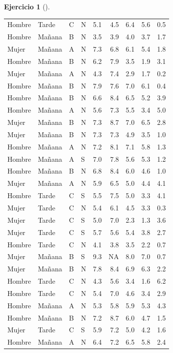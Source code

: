 \documentclass[
  a4paper,
]{scrreport}
\theoremstyle{definition}
\newtheorem{exercise}{Ejercicio}[chapter]
\theoremstyle{remark}
\begin{document}
\begin{exercise}[]
\begin{enumerate}
\begin{tcolorbox}
\begin{longtable}[]{@{}llllrrrrr@{}}
  Hombre & Tarde & C & N & 5.1 & 4.5 & 6.4 & 5.6 & 0.5 \\
  Hombre & Mañana & B & N & 3.5 & 3.9 & 4.0 & 3.7 & 1.7 \\
  Mujer & Mañana & A & N & 7.3 & 6.8 & 6.1 & 5.4 & 1.8 \\
  Hombre & Mañana & B & N & 6.2 & 7.9 & 3.5 & 1.9 & 3.1 \\
  Mujer & Mañana & A & N & 4.3 & 7.4 & 2.9 & 1.7 & 0.2 \\
  Hombre & Mañana & B & N & 7.9 & 7.6 & 7.0 & 6.1 & 0.4 \\
  Hombre & Mañana & B & N & 6.6 & 8.4 & 6.5 & 5.2 & 3.9 \\
  Hombre & Mañana & A & N & 5.6 & 7.3 & 5.5 & 3.4 & 5.0 \\
  Mujer & Mañana & B & N & 7.3 & 8.7 & 7.0 & 6.5 & 2.8 \\
  Mujer & Mañana & B & N & 7.3 & 7.3 & 4.9 & 3.5 & 1.0 \\
  Hombre & Mañana & A & N & 7.2 & 8.1 & 7.1 & 5.8 & 1.3 \\
  Hombre & Mañana & A & S & 7.0 & 7.8 & 5.6 & 5.3 & 1.2 \\
  Hombre & Mañana & B & N & 6.8 & 8.4 & 6.0 & 4.6 & 1.0 \\
  Mujer & Mañana & A & N & 5.9 & 6.5 & 5.0 & 4.4 & 4.1 \\
  Hombre & Tarde & C & S & 5.5 & 7.5 & 5.0 & 3.3 & 4.1 \\
  Mujer & Tarde & C & N & 5.4 & 6.1 & 4.5 & 3.3 & 0.3 \\
  Mujer & Tarde & C & S & 5.0 & 7.0 & 2.3 & 1.3 & 3.6 \\
  Mujer & Tarde & C & S & 5.7 & 5.6 & 5.4 & 3.8 & 2.7 \\
  Hombre & Tarde & C & N & 4.1 & 3.8 & 3.5 & 2.2 & 0.7 \\
  Mujer & Mañana & B & S & 9.3 & NA & 8.0 & 7.0 & 0.7 \\
  Mujer & Mañana & B & N & 7.8 & 8.4 & 6.9 & 6.3 & 2.2 \\
  Hombre & Tarde & C & N & 4.3 & 5.6 & 3.4 & 1.6 & 6.2 \\
  Hombre & Tarde & C & N & 5.4 & 7.0 & 4.6 & 3.4 & 2.9 \\
  Hombre & Mañana & A & N & 5.3 & 5.8 & 5.9 & 5.3 & 4.3 \\
  Hombre & Mañana & B & N & 7.2 & 8.7 & 6.0 & 4.7 & 1.5 \\
  Mujer & Tarde & C & S & 5.9 & 7.2 & 5.0 & 4.2 & 1.6 \\
  Hombre & Mañana & A & N & 6.4 & 7.2 & 6.5 & 5.8 & 2.4 \\

\end{longtable}
\end{tcolorbox}
\end{enumerate}
\end{exercise}
\end{document}
